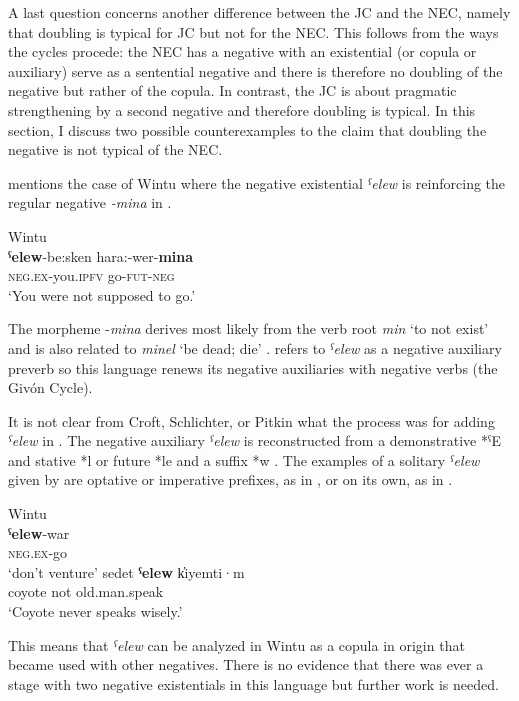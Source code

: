 \documentclass[output=paper,draft,draftmode,colorlinks,citecolor=brown]{langscibook}
\begin{document}
A last question concerns another difference between the JC and the NEC,
namely that doubling is typical for JC but not for the NEC. This follows
from the ways the cycles procede: the NEC has a negative with an
existential (or copula or auxiliary) serve as a sentential negative and
there is therefore no doubling of the negative but rather of the copula. In
contrast, the JC is about pragmatic strengthening by a second negative and
therefore doubling is typical. In this section, I discuss two possible
counterexamples to the claim that doubling the negative is not typical of
the NEC.

\citet[10]{Croft1991} mentions the case of Wintu where the
negative existential \textit{ˁelew} is reinforcing the regular negative
\textit{-mina} in . 

\begin{exe}\ex Wintu \label{ex:other-wintu-go}\\
    \gll \textbf{ˁelew}-be:sken    hara:-wer-\textbf{mina} \\
  \textsc{neg.ex}-you.\textsc{ipfv}  go-\textsc{fut-neg} \\
    \glt `You were not supposed to go.' \citep[198]{Pitkin1984}
    \end{exe}
%
The morpheme -\textit{mina} derives most likely from the verb root
\textit{min} `to not exist'
\parencites[361]{Schlichter1981}[121]{Pitkin1984} and is also related to
\textit{minel} `be dead; die' \citep[146]{Schlichter1981}.
\citet[311]{Schlichter1981} refers to \textit{ˁelew} as a negative
auxiliary preverb so this language renews its negative auxiliaries with
negative verbs (the Givón Cycle). 

It is not clear from Croft, Schlichter, or Pitkin what the process was for
adding \textit{ˁelew} in . The negative auxiliary
\textit{ˁelew} is reconstructed from a demonstrative *ˁE and stative *l or
future *le and a suffix *w \citep[164]{Pitkin1984}. The examples of a
solitary \textit{ˁelew} given by \citet[198]{Pitkin1984} are optative or
imperative prefixes, as in , or on its own, as in
.

\begin{exe}\ex Wintu \label{ex:other-wintu-venture}\\
    \gll \textbf{ˁelew}-war \\
\textsc{neg.ex}-go \\
    \glt `don't venture' \citep[198]{Pitkin1984}
    \ex \label{ex:other-wintu-coyote}
    \gll sedet  \textbf{ˁelew}  k̓iyemti·m \\
coyote  not  old.man.speak \\
    \glt `Coyote never speaks wisely.' \citep[269]{Pitkin1984}
    \end{exe}
%
This means that \textit{ˁelew} can be analyzed in Wintu as a
copula in origin that became used with other negatives. There is no
evidence that there was ever a stage with two negative existentials in this
language but further work is needed.
\end{document}
